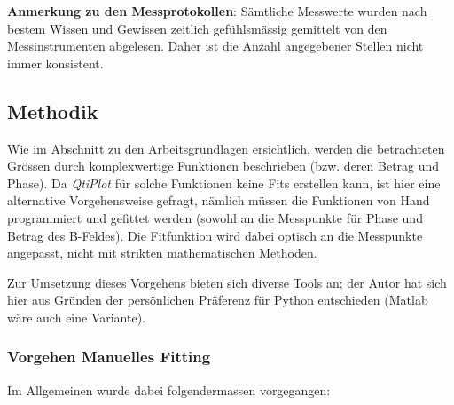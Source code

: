 \textbf{Anmerkung  zu den  Messprotokollen}: S\"amtliche  Messwerte wurden  nach
bestem  Wissen  und  Gewissen  zeitlich gef\"uhlsm\"assig  gemittelt  von  den
Messinstrumenten  abgelesen. Daher ist  die Anzahl  angegebener Stellen  nicht
immer konsistent.


\subsection{Methodik}
\label{sec:ausw:subsec:methodik}

Wie im Abschnitt zu den Arbeitsgrundlagen ersichtlich, werden die betrachteten
Gr\"ossen durch  komplexwertige Funktionen beschrieben (bzw.  deren Betrag und
Phase). Da \emph{QtiPlot}  f\"ur solche Funktionen keine  Fits erstellen kann,
ist  hier  eine alternative  Vorgehensweise  gefragt,  n\"amlich m\"ussen  die
Funktionen von Hand programmiert und gefittet werden (sowohl an die Messpunkte
f\"ur Phase  und Betrag des  B-Feldes). Die Fitfunktion wird dabei  optisch an
die Messpunkte angepasst, nicht mit strikten mathematischen Methoden.

Zur  Umsetzung  dieses Vorgehens  bieten  sich  diverse  Tools an;  der  Autor
hat  sich  hier aus  Gr\"unden  der  pers\"onlichen Pr\"aferenz  f\"ur  Python
entschieden (Matlab w\"are auch eine Variante).


\subsubsection{Vorgehen Manuelles Fitting}
\label{sec:ausw:subsec:methodik:subsubsec:fitting}
Im Allgemeinen wurde dabei folgendermassen vorgegangen:

